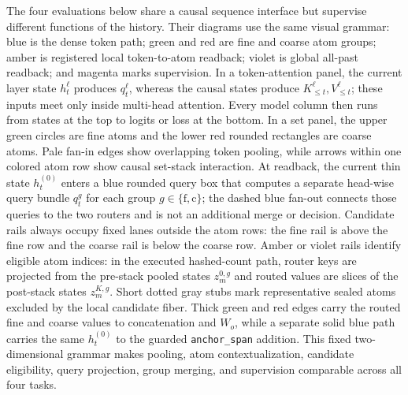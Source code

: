 \documentclass{article}
\theoremstyle{plain}
\theoremstyle{definition}
\theoremstyle{remark}
\begin{document}
The four evaluations below share a causal sequence interface but supervise
different functions of the history.  Their diagrams use the same visual
grammar: blue is the dense token path; green and red are fine and coarse atom
groups; amber is registered local token-to-atom readback; violet is global
all-past readback; and magenta marks supervision.  In a token-attention panel,
the current layer state $h_t^\ell$ produces $q_t^\ell$, whereas the causal
states produce $K_{\le t}^\ell,V_{\le t}^\ell$; these inputs meet only inside
multi-head attention.  Every model column then runs from states at the top to
logits or loss at the bottom.  In a set panel, the upper green circles are fine
atoms and the lower red rounded rectangles are coarse atoms.  Pale fan-in edges
show overlapping token pooling, while arrows within one colored atom row show
causal set-stack interaction.  At readback, the current thin state
$h_t^{(0)}$ enters a blue rounded query box that computes a separate head-wise
query bundle $q_t^g$ for each group $g\in\{\mathrm f,\mathrm c\}$; the dashed
blue fan-out connects those queries to the two routers and is not an additional
merge or decision.  Candidate rails always occupy fixed lanes outside the atom
rows: the fine rail is above the fine row and the coarse rail is below the
coarse row.  Amber or violet rails identify eligible atom indices: in the
executed hashed-count path, router keys are projected from the pre-stack pooled
states $z_m^{0,g}$ and routed values are slices of the post-stack states
$z_m^{K,g}$.  Short dotted gray stubs mark representative sealed atoms excluded
by the local candidate fiber.  Thick green and red edges carry the routed fine
and coarse values to concatenation and $W_o$, while a separate solid blue path
carries the same $h_t^{(0)}$ to the guarded \texttt{anchor\_span} addition.
This fixed two-dimensional grammar makes pooling, atom contextualization,
candidate eligibility, query projection, group merging, and supervision
comparable across all four tasks.
\end{document}
